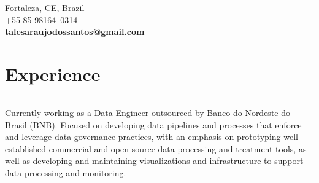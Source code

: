 \documentclass[]{rahulworld-resume}
\begin{document}
\begin{minipage}[t]{0.66\textwidth}
\hspace*{0pt}\hfill    \\
\hspace*{0pt}\hfill    \\
\hspace*{0pt}\hfill Fortaleza, CE, Brazil \\
\hspace*{0pt}\hfill  +55 85 98164\ 0314 \\
\hspace*{0pt}\hfill \textbf{\href{mailto:talesaraujodossantos@gmail.com}{talesaraujodossantos@gmail.com}} \\

\section{Experience}
\noindent\rule{12.5cm}{0.4pt}

 
\noindent
\hspace{5em}%
\begin{minipage}{0.85\textwidth\vspace{2pt}}
Currently working as a Data Engineer outsourced by Banco do Nordeste do Brasil (BNB). Focused on developing data pipelines and processes that enforce and leverage data governance practices, with an emphasis on prototyping well-established commercial and open source data processing and treatment tools, as well as developing and maintaining visualizations and infrastructure to support data processing and monitoring.

\end{minipage}
\sectionsep


\end{minipage}
\end{document}
